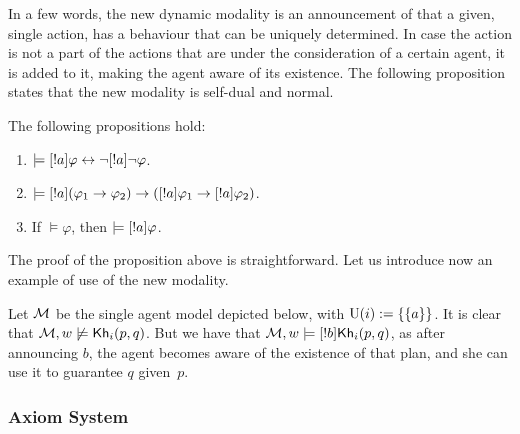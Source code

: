 \medskip

In a few words, the new dynamic modality is an announcement of that a given, single action, has a behaviour that can be uniquely determined. In case the action is not a part of the actions that are under the consideration of a certain agent, it is added to it, making the agent aware of its existence. 
The following proposition states that the new modality is self-dual and normal.

\medskip

\begin{proposition} The following propositions hold:
\begin{enumerate}
\item $\models [!a]\varphi \leftrightarrow \neg[!a]\neg\varphi$. 
\item $\models [!a](\varphi_1 \rightarrow \varphi_2) \rightarrow ([!a]\varphi_1 \rightarrow [!a]\varphi_2)$.
\item If $\models \varphi$, then $\models [!a]\varphi$.
\end{enumerate}
\end{proposition}

\medskip

The proof of the proposition above is straightforward. Let us introduce now an example of use of the new modality.

\medskip

\begin{example}
Let $\mathcal{M}$ be the single agent model depicted below, with $\operatorname{U}(i):=\{ \{ a \} \}$. It is clear that $\mathcal{M},w\not\models{\sf Kh}_i(p,q)$. But we have that $\mathcal{M},w\models[!b]{\sf Kh}_i(p,q)$, as after announcing $b$, the agent becomes aware of the existence of that plan, and she can use it to guarantee $q$ given~$p$. 
\begin{center}
\end{center} 
\end{example}

\subsubsection{Axiom System}

